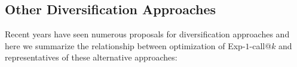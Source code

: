 %
%

\subsection{Other Diversification Approaches}

Recent years have seen numerous proposals for diversification
approaches and here we summarize the relationship between optimization
of Exp-$1$-call@$k$ and representatives of these alternative
approaches:

